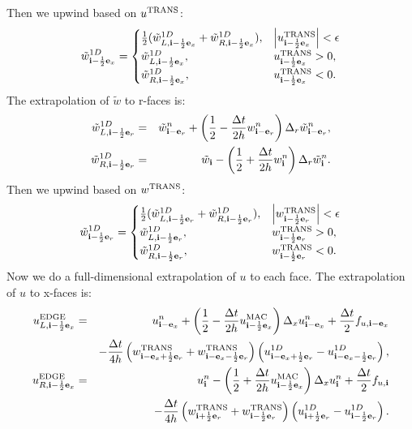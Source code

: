 \documentclass[11pt]{article}
\def\half  {\frac{1}{2}}
\def\dt    {\Delta t}
\def\edge  {\rm EDGE}
\def\mac   {\rm MAC}
\def\trans {\rm TRANS}
\def\eb    {{\bf e}}
\def\ib    {{\bf i}}
\def\wt    {\tilde{w}}
\begin{document}
Then we upwind based on $u^{\trans}$:
\begin{equation}
\wt_{\ib-\half\eb_x}^{1D} =
\begin{cases}
\half(\wt_{L,\ib-\half\eb_x}^{1D} + \wt_{R,\ib-\half\eb_x}^{1D}), & \left|u^{\trans}_{\ib-\half\eb_x}\right| < \epsilon \\
\wt_{L,\ib-\half\eb_x}^{1D}, & u^{\trans}_{\ib-\half\eb_x} > 0, \\
\wt_{R,\ib-\half\eb_x}^{1D}, & u^{\trans}_{\ib-\half\eb_x} < 0. \\
\end{cases}
\end{equation}
The extrapolation of $\wt$ to r-faces is:
\begin{eqnarray}
\wt_{L,\ib-\half\eb_r}^{1D} &=& \wt_{\ib-\eb_r}^n + \left(\half - \frac{\dt}{2h}w_{\ib-\eb_r}^n\right)\Delta_r \wt_{\ib-\eb_r}^n, \label{1D wt_L extrap} \\
\wt_{R,\ib-\half\eb_r}^{1D} &=& \wt_{\ib} - \left(\half + \frac{\dt}{2h}w_{\ib}^n\right)\Delta_r \wt_{\ib}^n. \label{1D wt_R extrap}
\end{eqnarray}
Then we upwind based on $w^{\trans}$:
\begin{equation}
\wt_{\ib-\half\eb_r}^{1D} =
\begin{cases}
\half(\wt_{L,\ib-\half\eb_r}^{1D} + \wt_{R,\ib-\half\eb_r}^{1D}), & \left|w^{\trans}_{\ib-\half\eb_r}\right| < \epsilon \\
\wt_{L,\ib-\half\eb_r}^{1D}, & w^{\trans}_{\ib-\half\eb_r} > 0, \\
\wt_{R,\ib-\half\eb_r}^{1D}, & w^{\trans}_{\ib-\half\eb_r} < 0. \\
\end{cases}
\end{equation}
Now we do a full-dimensional extrapolation of $u$ to each face.  The extrapolation of $u$ to x-faces is:
\begin{eqnarray}
u_{L,\ib-\half\eb_x}^{\edge} &=& u_{\ib-\eb_x}^n + \left(\half - \frac{\dt}{2h}u_{\ib-\half\eb_x}^{\mac}\right)\Delta_x u_{\ib-\eb_x}^n + \frac{\dt}{2}f_{u,\ib-\eb_x} \nonumber \\
&& - \frac{\dt}{4h}\left(w_{\ib-\eb_x+\half\eb_r}^{\trans}+w_{\ib-\eb_x-\half\eb_r}^{\trans}\right)\left(u_{\ib-\eb_x+\half\eb_r}^{1D} - u_{\ib-\eb_x-\half\eb_r}^{1D}\right), \\
u_{R,\ib-\half\eb_x}^{\edge} &=& u_{\ib}^n - \left(\half + \frac{\dt}{2h}u_{\ib-\half\eb_x}^{\mac}\right)\Delta_x u_{\ib}^n + \frac{\dt}{2}f_{u,\ib} \nonumber \\
&& - \frac{\dt}{4h}\left(w_{\ib+\half\eb_r}^{\trans}+w_{\ib-\half\eb_r}^{\trans}\right)\left(u_{\ib+\half\eb_r}^{1D} - u_{\ib-\half\eb_r}^{1D}\right).
\end{eqnarray}
\end{document}
